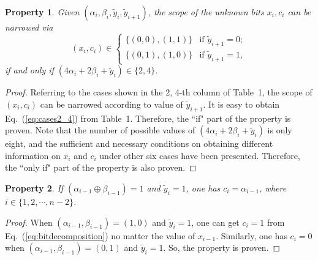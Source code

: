 \documentclass{ws-ijbc}
\newtheorem{property}{Property}
\begin{document}
\begin{property}
Given $(\alpha_i, \beta_i, \tilde{y}_{i}, \tilde{y}_{i+1})$, the scope of the unknown bits $x_i, c_i$ can be narrowed via
\begin{equation}
(x_i, c_i)\in
\begin{cases}
\{(0, 0), (1, 1)\} & \mbox{if } \tilde{y}_{i+1}=0;\\
\{(0, 1), (1, 0)\} & \mbox{if } \tilde{y}_{i+1}=1,
\end{cases}
\label{eq:cases2_4}
\end{equation}
if and only if $(4\alpha_i+2\beta_i+\tilde{y}_i)\in \{2, 4\}$.
\end{property}
\begin{proof}
Referring to the cases shown in the 2, 4-th column of Table~1, the scope of $(x_i, c_i)$ can be narrowed according to value of $\tilde{y}_{i+1}$.
It is easy to obtain Eq.~(\ref{eq:cases2_4}) from Table~1. Therefore, the ``if" part of the property is proven. Note that the number of possible values of $(4\alpha_i+2\beta_i+\tilde{y}_i)$ is only eight, and the sufficient and necessary conditions on obtaining different information on $x_i$ and $c_i$ under other six cases have been presented. Therefore, the ``only if" part of the property is also proven.
\end{proof}
\iffalse
\begin{property}
Given a set of $(\alpha, \beta, \tilde{y})$, some (even all) bits of the $n-1$ least significant bits of $x$ in Eq.~(\ref{eq:essentialfunction}) and their locations can be determined by checking
the bit plane of Eq.~(\ref{eq:essentialfunction}) from the least significant bit to the most significant one in order.
\end{property}
\fi

\begin{property}
If $(\alpha_{i-1}\oplus \beta_{i-1})=1$ and $\tilde{y}_i=1$, one has
$c_i=\alpha_{i-1}$, where $i\in\{1, 2, \cdots,  n-2\}$.
\end{property}
\begin{proof}
When $(\alpha_{i-1}, \beta_{i-1})=(1, 0)$ and $\tilde{y}_i=1$, one can get $c_i=1$ from Eq.~(\ref{eq:bitdecomposition}) no matter the value
of $x_{i-1}$. Similarly, one has $c_i=0$ when $(\alpha_{i-1}, \beta_{i-1})=(0, 1)$ and $\tilde{y}_i=1$. So, the property is proven.
\end{proof}
\end{document}
